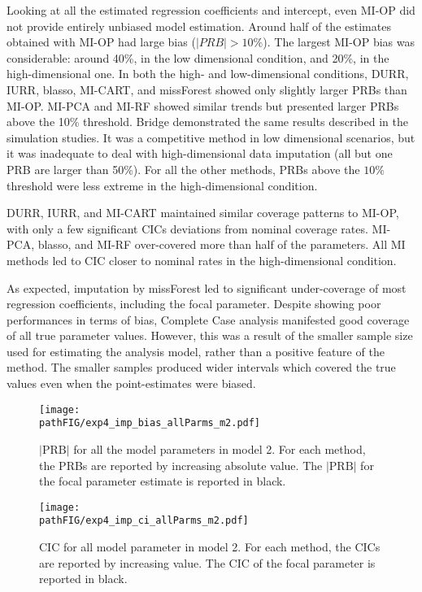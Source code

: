 	Looking at all the estimated regression coefficients and intercept, even MI-OP did not provide entirely unbiased
	model estimation.
	Around half of the estimates obtained with MI-OP had large bias ($|PRB|>10\%$).
	The largest MI-OP bias was considerable: around 40\%, in the low dimensional condition, and 20\%, in the 
	high-dimensional one.
	In both the high- and low-dimensional conditions, DURR, IURR, blasso, MI-CART, and
	missForest showed only slightly larger PRBs than MI-OP.
	MI-PCA and MI-RF showed similar trends but presented larger PRBs above the 10\% threshold.
	Bridge demonstrated the same results described in the simulation studies. 
	It was a competitive method in low dimensional scenarios, but it was inadequate to deal with high-dimensional 
	data imputation (all but one PRB are larger than 50\%).
	For all the other methods, PRBs above the $10\%$ threshold were less extreme in the high-dimensional condition.

	DURR, IURR, and MI-CART maintained similar coverage patterns to MI-OP, with only 
	a few significant CICs deviations from nominal coverage rates.
	MI-PCA, blasso, and MI-RF over-covered more than half of the parameters.
	All MI methods led to CIC closer to nominal rates in the high-dimensional condition.
	
	As expected, imputation by missForest led to significant under-coverage of most regression coefficients, 
	including the focal parameter. 
	Despite showing poor performances in terms of bias, Complete Case analysis manifested good 
	coverage of all true parameter values.
	However, this was a result of the smaller sample size used for estimating the analysis model, rather than 
	a positive feature of the method.
	The smaller samples produced wider intervals which covered the true values even when the point-estimates 
	were biased.

\begin{figure}
	\centering
	\texttt{[image: \\pathFIG/exp4\_imp\_bias\_allParms\_m2.pdf]}
	\caption{
		$|\text{PRB}|$ for all the model parameters in model 2.
		For each method, the PRBs are reported by increasing absolute value.
		The $|\text{PRB}|$ for the focal parameter estimate is reported in black.
	}
		\label{fig:exp4_bias_allP}
\end{figure}

\begin{figure}
	\centering
	\texttt{[image: \\pathFIG/exp4\_imp\_ci\_allParms\_m2.pdf]}
	\caption{
		CIC for all model parameter in model 2.
		For each method, the CICs are reported by increasing value.
		The CIC of the focal parameter is reported in black.
	}
	\label{fig:exp4_ci_allP}
\end{figure}

